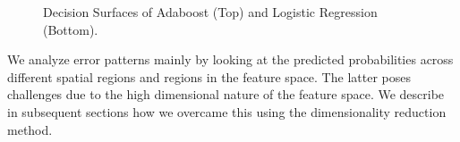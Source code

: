 \documentclass[11pt, letterpaper, journal]{IEEEtran}
\begin{document}
\begin{figure}
    \centering
    \qquad
    \caption{Decision Surfaces of Adaboost (Top) and Logistic Regression (Bottom). }
    \label{fig:decision_surface}
\end{figure}

We analyze error patterns mainly by looking at the predicted probabilities across different spatial regions and regions in the feature space. The latter poses challenges due to the high dimensional nature of the feature space. We describe in subsequent sections how we overcame this using the dimensionality reduction method.
\end{document}
